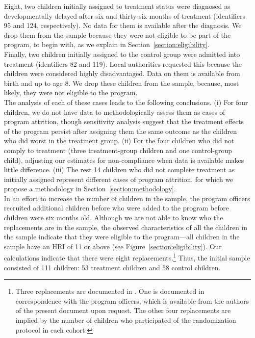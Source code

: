 \noindent Eight, two children initially assigned to treatment status were diagnosed as developmentally delayed after six and thirty-six months of treatment (identifiers 95 and 124, respectively). No data for them is available after the diagnosis. We drop them from the sample because they were not eligible to be part of the program, to begin with, as we explain in Section~\ref{section:eligibility}.\\

\noindent Finally, two children initially assigned to the control group were admitted into treatment (identifiers 82 and 119). Local authorities requested this because the children were considered highly disadvantaged. Data on them is available from birth and up to age 8. We drop these children from the sample, because, most likely, they were not eligible to the program.\\

\noindent The analysis of each of these cases leads to the following conclusions. (i) For four children, we do not have data to methodologically assess them as cases of program attrition, though sensitivity analysis suggest that the treatment effects of the program persist after assigning them the same outcome as the children who did worst in the treatment group. (ii) For the four children who did not comply to treatment (three treatment-group children and one control-group child), adjusting our estimates for non-compliance when data is available makes little difference. (iii) The rest 14 children who did not complete treatment as initially assigned represent different cases of program attrition, for which we propose a methodology in Section~\ref{section:methodology}.\\

\noindent In an effort to increase the number of children in the sample, the program officers recruited additional children before who were added to the program before children were six months old. Although we are not able to know who the replacements are in the sample, the observed characteristics of all the children in the sample indicate that they were eligible to the program---all children in the sample have an HRI of 11 or above (see Figure~\ref{section:eligibility}). Our calculations indicate that there were eight replacements.\footnote{Three replacements are documented in \citet{Ramey_Campbell_1979_SR}. One is documented in correspondence with the program officers, which is available from the authors of the present document upon request. The other four replacements are implied by the number of children who participated of the randomization protocol in each cohort.} Thus, the initial sample consisted of 111 children: 53 treatment children and 58 control children.\\

